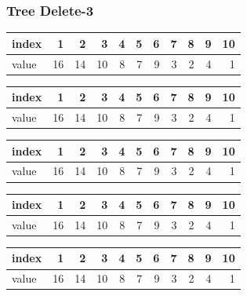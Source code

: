 \documentclass[10pt]{beamer}
\begin{document}
\begin{frame}[t]\frametitle{Tree Delete-3}



	\begin{tabular}
	{| l	|| r| r| r	| r	| r	| r	| r	| r	| r	| r	|}
	\hline
	index	&1	&2	&3	&4	&5	&6	&7	&8	&9	&10\\	
	\hline
	value	&16	&14	&10	&8	&7	&9	&3	&2	&4	&1\\
	\hline
	\end{tabular}

	\addtolength{\tabcolsep}{-1pt}
	\begin{tabular}
	{| l	|| r| r| r	| r	| r	| r	| r	| r	| r	| r	|}
	\hline
	index	&1	&2	&3	&4	&5	&6	&7	&8	&9	&10\\	
	\hline
	value	&16	&14	&10	&8	&7	&9	&3	&2	&4	&1\\
	\hline
	\end{tabular}
	\addtolength{\tabcolsep}{+1pt}

	\addtolength{\tabcolsep}{-2pt}
	\begin{tabular}
	{| l	|| r| r| r	| r	| r	| r	| r	| r	| r	| r	|}
	\hline
	index	&1	&2	&3	&4	&5	&6	&7	&8	&9	&10\\	
	\hline
	value	&16	&14	&10	&8	&7	&9	&3	&2	&4	&1\\
	\hline
	\end{tabular}

	\addtolength{\tabcolsep}{0pt}
	\begin{tabular}
	{| l	|| r| r| r	| r	| r	| r	| r	| r	| r	| r	|}
	\hline
	index	&1	&2	&3	&4	&5	&6	&7	&8	&9	&10\\	
	\hline
	value	&16	&14	&10	&8	&7	&9	&3	&2	&4	&1\\
	\hline
	\end{tabular}

\addtolength{\tabcolsep}{+2pt}
	\begin{tabular}
	{| l	|| r| r| r	| r	| r	| r	| r	| r	| r	| r	|}
	\hline
	index	&1	&2	&3	&4	&5	&6	&7	&8	&9	&10\\	
	\hline
	value	&16	&14	&10	&8	&7	&9	&3	&2	&4	&1\\
	\hline
	\end{tabular}

\end{frame}
\end{document}
